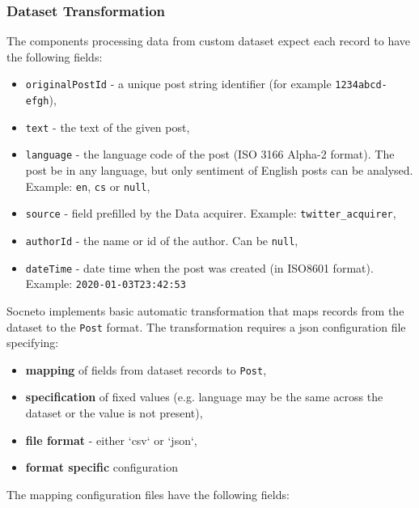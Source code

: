 \documentclass{article}
\begin{document}
\subsubsection{Dataset Transformation}
The components processing data from custom dataset expect each record to have the following fields:

\begin{itemize}
    \item \texttt{originalPostId} - a unique post string identifier (for example \texttt{1234abcd-efgh}),
    \item \texttt{text} - the text of the given post,
    \item \texttt{language} - the language code of the post (ISO 3166 Alpha-2 format).  The post be in any language, but only sentiment of English posts can be analysed. Example: \texttt{en}, \texttt{cs} or \texttt{null},
    \item \texttt{source} - field prefilled by the Data acquirer. Example: \texttt{twitter\_acquirer},
    \item \texttt{authorId} - the name or id of the author. Can be \texttt{null},
    \item \texttt{dateTime} - date time when the post was created (in ISO8601 format). Example: \texttt{2020-01-03T23:42:53}
\end{itemize}

Socneto implements basic automatic transformation that maps records from the dataset to the \texttt{Post} format. The transformation requires a json configuration file specifying:

\begin{itemize}
    \item \textbf{mapping} of fields from dataset records to \texttt{Post},
    \item \textbf{specification} of fixed values (e.g. language may be the same across the dataset or the value is not present),
    \item \textbf{file format} - either `csv` or `json`,
    \item  \textbf{format specific} configuration
\end{itemize}

The mapping configuration files have the following  fields:
\end{document}
